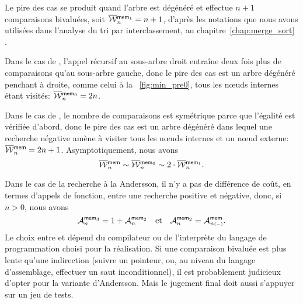 Le pire des cas se produit quand l'arbre est dégénéré et  effectue \(n+1\)
comparaisons bivaluées, soit \(\OW{\fun{mem}_1}{n} = n +
1\), d'après les notations que nous
avons utilisées dans l'analyse du tri par interclassement, au chapitre~\ref{chap:merge_sort}
.

Dans le cas de , l'appel récursif au sous-arbre droit
entraîne deux fois plus de comparaisons qu'au sous-arbre gauche, donc
le pire des cas est un arbre dégénéré penchant à droite, comme celui à
la \fig~\vref{fig:min_pre0}, tous les n{\oe}uds internes étant
visités: \(\OW{\fun{mem}_0}{n} = 2n\).

Dans le cas de , le nombre de comparaisons est symétrique
parce que l'égalité est vérifiée d'abord, donc le pire des cas est un
arbre dégénéré dans lequel une recherche négative amène à visiter tous
les n{\oe}uds internes et un n{\oe}ud externe: \(\OW{\fun{mem}}{n} =
2n + 1\). Asymptotiquement, nous avons
\begin{equation*}
\OW{\fun{mem}}{n} \sim \OW{\fun{mem}_0}{n}
\sim 2 \cdot \OW{\fun{mem}_1}{n}.
\end{equation*}

Dans le cas de la recherche à la Andersson, il n'y a pas de différence
de coût, en termes d'appels de fonction, entre une recherche positive
et négative, donc, si \(n > 0\), nous avons
\begin{equation}
\M{\fun{mem}_3}{n} = 1 + \M{\fun{mem}_2}{n}\quad\text{et}\quad
\M{\fun{mem}_2}{n} = \M{\fun{mem}}{n{\scriptscriptstyle (-)}}.
\label{eq:Andersson_average}
\index{mem3@$\M{\fun{mem}_3}{n}$}\index{mem2@$\M{\fun{mem}_2}{n}$}
\end{equation}
Le choix entre  et  dépend du
compilateur ou de l'interprète du langage de programmation choisi pour
la réalisation. Si une comparaison bivaluée est plus lente qu'une
indirection (suivre un pointeur, ou, au niveau du langage
d'assemblage, effectuer un saut inconditionnel), il est probablement
judicieux d'opter pour la variante d'Andersson. Mais le jugement final
doit aussi s'appuyer sur un jeu de tests.

